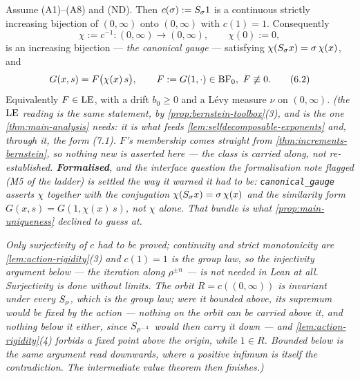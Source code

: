 \begin{proposition}\label{prop:canonical-gauge}
\leanok
Assume (A1)--(A8) and (ND). Then $c(\sigma) := S_\sigma 1$ is a continuous strictly
increasing bijection of $(0,\infty)$ onto $(0,\infty)$ with $c(1) = 1$. Consequently
\[
  \chi := c^{-1} : (0,\infty) \to (0,\infty), \qquad \chi(0) := 0,
\]
is an increasing bijection --- \emph{the canonical gauge} --- satisfying
$\chi(S_\sigma x) = \sigma\,\chi(x)$, and
\[
  G(x, s) = F\bigl(\chi(x)\, s\bigr), \qquad
  F := G(1, \cdot) \in \mathrm{BF}_0,\ F \not\equiv 0. \tag{6.2}
\]
Equivalently $F \in \mathrm{LE}$, with a drift $b_0 \ge 0$ and a Lévy measure $\nu$ on $(0,\infty)$.
\statusT\quad\emph{(the $\mathrm{LE}$ reading is the same statement, by \ref{prop:bernstein-toolbox}(3),
and is the one \ref{thm:main-analysis} needs: it is what feeds
\ref{lem:selfdecomposable-exponents} and, through it, the form (7.1). $F$'s membership comes
straight from \ref{thm:increments-bernstein}, so nothing new is asserted here --- the class is
carried along, not re-established. \textbf{Formalised}, and the interface question the
formalisation note flagged (M5 of the ladder) is settled the way it warned it had to be:
\texttt{canonical\_gauge} asserts $\chi$ together with the conjugation
$\chi(S_\sigma x) = \sigma\,\chi(x)$ and the similarity form $G(x,s) = G(1,\chi(x)\,s)$,
not $\chi$ alone. That bundle is what \ref{prop:main-uniqueness} declined to guess at.}

\emph{Only surjectivity of $c$ had to be proved; continuity and strict monotonicity are
\ref{lem:action-rigidity}(3) and $c(1) = 1$ is the group law, so the injectivity argument below
--- the iteration along $\rho^{\pm n}$ --- is not needed in Lean at all. Surjectivity is done
without limits. The orbit $R = c((0,\infty))$ is invariant under every $S_\rho$, which
\emph{is} the group law; were it bounded above, its supremum would be fixed by the action ---
nothing on the orbit can be carried above it, and nothing below it either, since
$S_{\rho^{-1}}$ would then carry it down --- and \ref{lem:action-rigidity}(4) forbids a fixed
point above the origin, while $1 \in R$. Bounded below is the same argument read downwards, where
a positive infimum is itself the contradiction. The intermediate value theorem then finishes.)}
\end{proposition}

